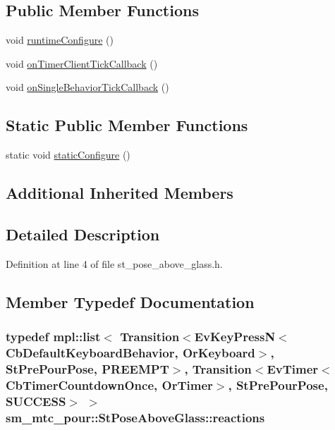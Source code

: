 \subsection*{Public Member Functions}
\begin{DoxyCompactItemize}
\item 
void \hyperlink{structsm__mtc__pour_1_1StPoseAboveGlass_a42963c8852dbb6bb5620111a53a9cfd5}{runtime\+Configure} ()
\item 
void \hyperlink{structsm__mtc__pour_1_1StPoseAboveGlass_a57428d490d9ade28b93c09c3397a71fb}{on\+Timer\+Client\+Tick\+Callback} ()
\item 
void \hyperlink{structsm__mtc__pour_1_1StPoseAboveGlass_a6ffeb0e5d89aa62589cfe21e0b0ef1f1}{on\+Single\+Behavior\+Tick\+Callback} ()
\end{DoxyCompactItemize}
\subsection*{Static Public Member Functions}
\begin{DoxyCompactItemize}
\item 
static void \hyperlink{structsm__mtc__pour_1_1StPoseAboveGlass_aefcdf4cae9f45d971ef148a81cda034f}{static\+Configure} ()
\end{DoxyCompactItemize}
\subsection*{Additional Inherited Members}


\subsection{Detailed Description}


Definition at line 4 of file st\+\_\+pose\+\_\+above\+\_\+glass.\+h.



\subsection{Member Typedef Documentation}
\subsubsection[{\texorpdfstring{reactions}{reactions}}]{\setlength{\rightskip}{0pt plus 5cm}typedef mpl\+::list$<$ Transition$<$Ev\+Key\+PressN$<$Cb\+Default\+Keyboard\+Behavior, {\bf Or\+Keyboard}$>$, {\bf St\+Pre\+Pour\+Pose}, {\bf P\+R\+E\+E\+M\+PT}$>$, Transition$<$Ev\+Timer$<$Cb\+Timer\+Countdown\+Once, {\bf Or\+Timer}$>$, {\bf St\+Pre\+Pour\+Pose}, {\bf S\+U\+C\+C\+E\+SS}$>$ $>$ {\bf sm\+\_\+mtc\+\_\+pour\+::\+St\+Pose\+Above\+Glass\+::reactions}}\hypertarget{structsm__mtc__pour_1_1StPoseAboveGlass_aadc13c7d4daeb803f32078b3181ded27}{}\label{structsm__mtc__pour_1_1StPoseAboveGlass_aadc13c7d4daeb803f32078b3181ded27}


